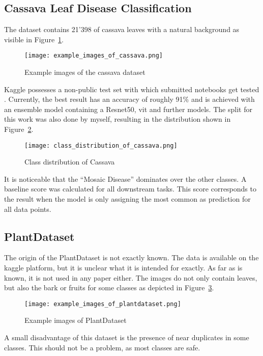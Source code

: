 \subsection{Cassava Leaf Disease Classification}
The dataset contains 21'398 of cassava leaves with a natural background as visible in Figure~\ref{fig:example_images_of_cassava}.
\begin{figure}[H]
    \begin{center}
    \texttt{[image: example\_images\_of\_cassava.png]}
    \caption{Example images of the cassava dataset}\label{fig:example_images_of_cassava}
    \end{center}
\end{figure}
Kaggle possesses a non-public test set with which submitted notebooks get tested \autocite{mwebaze2020}. 
Currently, the best result has an accuracy of roughly 91\% and is achieved with an ensemble model containing a Resnet50, \gls{vit} and further models.  
The split for this work was also done by myself, resulting in the distribution shown in Figure~\ref{fig:class_distribution_of_cassava}.
\begin{figure}[H]
    \begin{center}
    \texttt{[image: class\_distribution\_of\_cassava.png]}
    \caption{Class distribution of Cassava}\label{fig:class_distribution_of_cassava}
    \end{center}
\end{figure}
It is noticeable that the ``Mosaic Disease'' dominates over the other classes. 
A baseline score was calculated for all downstream tasks. 
This score corresponds to the result when the model is only assigning the most common as prediction for all data points. 

\subsection{PlantDataset}
The origin of the PlantDataset is not exactly known. The data is available on the kaggle platform, but it is unclear what it is intended for exactly. 
As far as is known, it is not used in any paper either.
The images do not only contain leaves, but also the bark or fruits for some classes as depicted in Figure~\ref{fig:example_images_of_plantdataset}.
\begin{figure}[H]
    \begin{center}
    \texttt{[image: example\_images\_of\_plantdataset.png]}
    \caption{Example images of PlantDataset}\label{fig:example_images_of_plantdataset}
    \end{center}
\end{figure}
A small disadvantage of this dataset is the presence of near duplicates in some classes. This should not be a problem, as most classes are safe.

